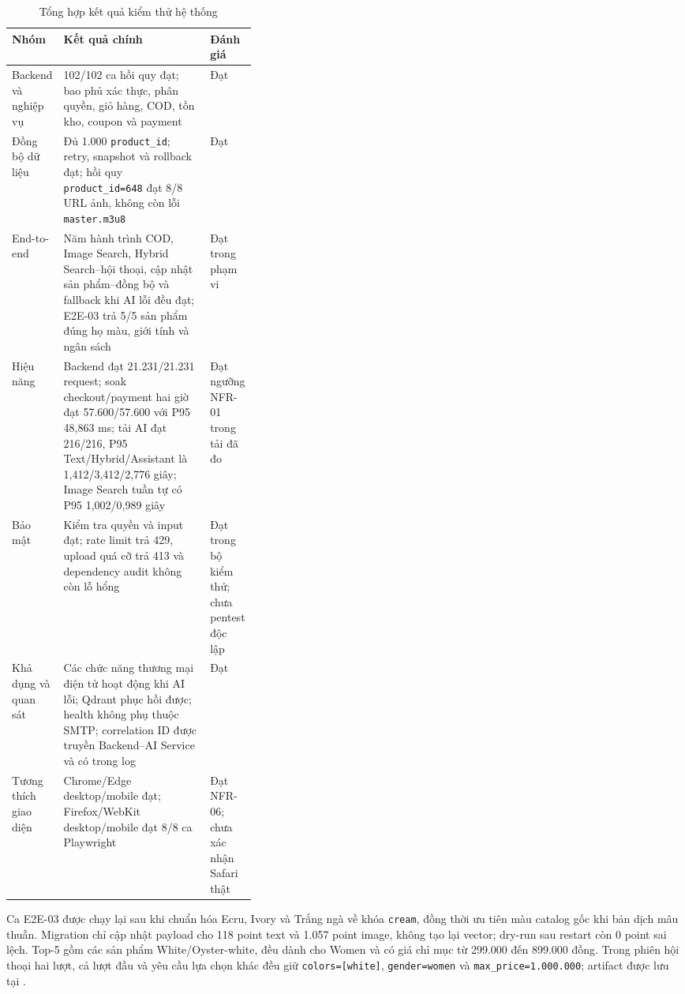 \begin{table}[H]
\centering
\caption{Tổng hợp kết quả kiểm thử hệ thống}
\label{tab:executed-system-results}
\begin{tabularx}{\linewidth}{|p{0.20\linewidth}|X|p{0.16\linewidth}|}
\hline
\textbf{Nhóm} & \textbf{Kết quả chính} & \textbf{Đánh giá} \\ \hline
Backend và nghiệp vụ & 102/102 ca hồi quy đạt; bao phủ xác thực, phân quyền, giỏ hàng, COD, tồn kho, coupon và payment & Đạt \\ \hline
Đồng bộ dữ liệu & Đủ 1.000 \texttt{product\_id}; retry, snapshot và rollback đạt; hồi quy \texttt{product\_id=648} đạt 8/8 URL ảnh, không còn lỗi \texttt{master.m3u8} & Đạt \\ \hline
End-to-end & Năm hành trình COD, Image Search, Hybrid Search--hội thoại, cập nhật sản phẩm--đồng bộ và fallback khi AI lỗi đều đạt; E2E-03 trả 5/5 sản phẩm đúng họ màu, giới tính và ngân sách & Đạt trong phạm vi \\ \hline
Hiệu năng & Backend đạt 21.231/21.231 request; soak checkout/payment hai giờ đạt 57.600/57.600 với P95 48,863 ms; tải AI đạt 216/216, P95 Text/Hybrid/Assistant là 1,412/3,412/2,776 giây; Image Search tuần tự có P95 1,002/0,989 giây & Đạt ngưỡng NFR-01 trong tải đã đo \\ \hline
Bảo mật & Kiểm tra quyền và input đạt; rate limit trả 429, upload quá cỡ trả 413 và dependency audit không còn lỗ hổng & Đạt trong bộ kiểm thử; chưa pentest độc lập \\ \hline
Khả dụng và quan sát & Các chức năng thương mại điện tử hoạt động khi AI lỗi; Qdrant phục hồi được; health không phụ thuộc SMTP; correlation ID được truyền Backend--AI Service và có trong log & Đạt \\ \hline
Tương thích giao diện & Chrome/Edge desktop/mobile đạt; Firefox/WebKit desktop/mobile đạt 8/8 ca Playwright & Đạt NFR-06; chưa xác nhận Safari thật \\ \hline
\end{tabularx}
\end{table}

Ca E2E-03 được chạy lại sau khi chuẩn hóa Ecru, Ivory và Trắng ngà về khóa \texttt{cream}, đồng thời ưu tiên màu catalog gốc khi bản dịch mâu thuẫn. Migration chỉ cập nhật payload cho 118 point text và 1.057 point image, không tạo lại vector; dry-run sau restart còn 0 point sai lệch. Top-5 gồm các sản phẩm White/Oyster-white, đều dành cho Women và có giá chỉ mục từ 299.000 đến 899.000 đồng. Trong phiên hội thoại hai lượt, cả lượt đầu và yêu cầu lựa chọn khác đều giữ \texttt{colors=[white]}, \texttt{gender=women} và \texttt{max\_price=1.000.000}; artifact được lưu tại .

